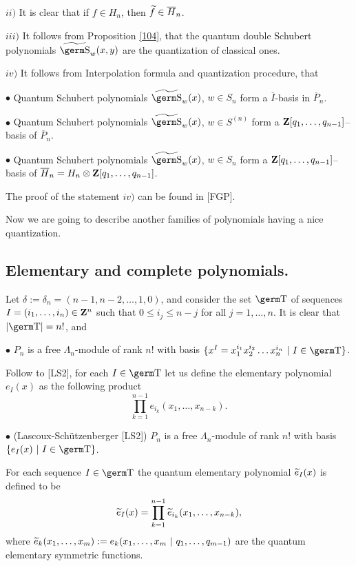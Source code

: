 {{$ii)$ It is clear that if $f\in H_n$, then $\widetilde f\in\overline H_n$.
 
$iii)$ It follows from Proposition \ref{104}, that the quantum double Schubert 
polynomials $\wt{\s}_w(x,y)$ are the quantization of classical ones.

$iv)$ It follows from Interpolation formula and quantization procedure, that

$\bullet$ Quantum Schubert polynomials $\wt{\s}_w(x)$, $w\in S_n$ form a 
$\overline I$-basis in $\overline P_n$.

$\bullet$ Quantum Schubert polynomials $\wt{\s}_w(x)$, $w\in S^{(n)}$ form a 
${\bf Z}[q_1,\ldots ,q_{n-1}]$--basis of $\overline P_n$.

$\bullet$ Quantum Schubert polynomials $\wt{\s}_w(x)$, $w\in S_n$ form a 
${\bf Z}[q_1,\ldots ,q_{n-1}]$--basis of $\overline H_n=
H_n\otimes{\bf Z}[q_1,\ldots ,q_{n-1}]$.

The proof of the statement $iv)$ can be found in [FGP].
\smallskip

Now we are going to describe another families of polynomials having a nice 
quantization.

\subsection{Elementary and complete polynomials.}

Let $\delta :=\delta_n=(n-1,n-2,\ldots ,1,0)$, and consider the set $\t $ 
of sequences $I=(i_1,\ldots ,i_n)\in{\bf Z}^n$ such that $0\le i_j\le 
n-j$ for all $j=1,\ldots ,n$. It is clear that $|\t |=n!$, and

$\bullet$ $P_n$ is a free $\Lambda_n$-module of rank $n!$ with basis 
$\{x^I=x_1^{i_1}x_2^{i_2}\ldots x_n^{i_n}~|~I\in\t\}$. 

Follow to [LS2], for each $I\in\t$ let us define the elementary polynomial 
$e_I(x)$ as the following product
$$\prod_{k=1}^{n-1}e_{i_k}(x_1,\ldots ,x_{n-k}).
$$

$\bullet$ (Lascoux-Sch\"utzenberger [LS2]) $P_n$ is a free 
$\Lambda_n$-module of rank $n!$ with basis $\{e_I(x)~|~I\in\t\}$.

\begin{de} For each sequence $I\in\t$ %
the quantum elementary polynomial ${\widetilde e}_I(x)$ is defined to be
$${\widetilde e}_I(x)=\prod_{k=1}^{n-1}{\widetilde e}_{i_k}(x_1,\ldots ,x_{n-k}),
$$
where ${\widetilde e}_k(x_1,\ldots ,x_m):=e_k(x_1,\ldots ,x_m~|~q_1,\ldots 
,q_{m-1})$ are the quantum elementary symmetric functions.
\end{de}

}}
